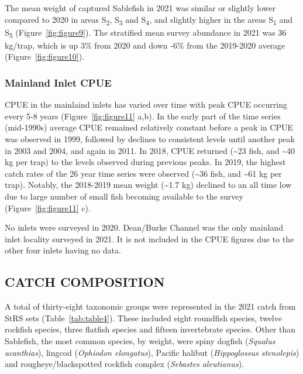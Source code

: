 \documentclass[12pt]{article}\usepackage[]{graphicx}\usepackage[]{color}
\begin{document}
The mean weight of captured Sablefish in 2021 was similar or slightly lower compared to 2020 in areas S\textsubscript{2}, S\textsubscript{3} and S\textsubscript{4}, and slightly higher in the areas S\textsubscript{1} and S\textsubscript{5} (Figure~\ref{fig:figure9}). The stratified mean survey abundance in 2021 was 36 kg/trap, which is up 3\% from 2020 and down -6\% from the 2019-2020 average (Figure~\ref{fig:figure10}).

\hypertarget{mainland-inlet-cpue}{%
\subsubsection{Mainland Inlet CPUE}\label{mainland-inlet-cpue}}

CPUE in the mainlaind inlets has varied over time with peak CPUE occurring every 5-8 years (Figure~\ref{fig:figure11} a,b). In the early part of the time series (mid-1990s) average CPUE remained relatively constant before a peak in CPUE was observed in 1999, followed by declines to consistent levels until another peak in 2003 and 2004, and again in 2011. In 2018, CPUE returned (\textasciitilde23 fish, and \textasciitilde40 kg per trap) to the levels observed during previous peaks. In 2019, the highest catch rates of the 26 year time series were observed (\textasciitilde36 fish, and \textasciitilde61 kg per trap). Notably, the 2018-2019 mean weight (\textasciitilde1.7 kg) declined to an all time low due to large number of small fish becoming available to the survey (Figure~\ref{fig:figure11} c).

No inlets were surveyed in 2020. Dean/Burke Channel was the only mainland inlet locality surveyed in 2021. It is not included in the CPUE figures due to the other four inlets having no data.

\hypertarget{catch-composition}{%
\subsection{CATCH COMPOSITION}\label{catch-composition}}

A total of thirty-eight taxonomic groups were represented in the 2021 catch from StRS sets (Table~\ref{tab:table4}). These included eight roundfish species, twelve rockfish species, three flatfish species and fifteen invertebrate species. Other than Sablefish, the most common species, by weight, were spiny dogfish (\emph{Squalus acanthias}), lingcod (\emph{Ophiodon elongatus}), Pacific halibut (\emph{Hippoglossus stenolepis}) and rougheye/blackspotted rockfish complex (\emph{Sebastes aleutianus}).
\end{document}
